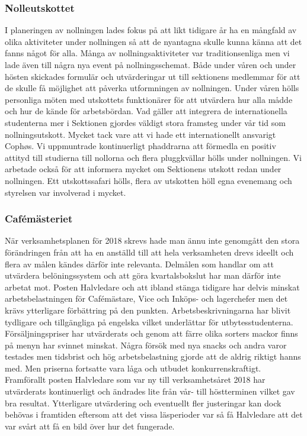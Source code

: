 \documentclass[../_main/handlingar.tex]{subfiles}
\begin{document}
\subsubsection*{Nolleutskottet}

I planeringen av nollningen lades fokus på att likt tidigare år ha en mångfald av olika aktiviteter under
nollningen så att de nyantagna skulle kunna känna att det fanns något för alla. Många av
nollningsaktiviteter var traditionsenliga men vi lade även till några nya event på nollningsschemat.
Både under våren och under hösten skickades formulär och utvärderingar ut till sektionens
medlemmar för att de skulle få möjlighet att påverka utformningen av nollningen. Under våren hölls
personliga möten med utskottets funktionärer för att utvärdera hur alla mådde och hur de kände för
arbetsbördan.
Vad gäller att integrera de internationella studenterna mer i Sektionen gjordes väldigt stora framsteg
under vår tid som nollningsutskott. Mycket tack vare att vi hade ett internationellt ansvarigt Cophøs.
Vi uppmuntrade kontinuerligt phaddrarna att förmedla en positiv attityd till studierna till nollorna
och flera pluggkvällar hölls under nollningen. Vi arbetade också för att informera mycket om
Sektionens utskott redan under nollningen. Ett utskottssafari hölls, flera av utskotten höll egna
evenemang och styrelsen var involverad i mycket.



\subsubsection*{Cafémästeriet}

När verksamhetsplanen för 2018 skrevs hade man ännu inte genomgått den stora förändringen från
att ha en anställd till att hela verksamheten drevs ideellt och flera av målen kändes därför inte
relevanta. Delmålen som handlar om att utvärdera belöningssystem och att göra kvartalsbokslut har
man därför inte arbetat mot. Posten Halvledare och att ibland stänga tidigare har delvis minskat
arbetsbelastningen för Cafémästare, Vice och Inköps- och lagerchefer men det krävs ytterligare
förbättring på den punkten. Arbetsbeskrivningarna har blivit tydligare och tillgängliga på engelska
vilket underlättar för utbytesstudenterna.
Försäljningspriser har utvärderats och genom att färre olika sorters mackor finns på menyn har
svinnet minskat. Några försök med nya snacks och andra varor testades men tidsbrist och hög
arbetsbelastning gjorde att de aldrig riktigt hanns med. Men priserna fortsatte vara låga och utbudet
konkurrenskraftigt.
Framförallt posten Halvledare som var ny till verksamhetsåret 2018 har utvärderats kontinuerligt och
ändrades lite från vår- till höstterminen vilket gav bra resultat. Ytterligare utvärdering och eventuellt
fler justeringar kan dock behövas i framtiden eftersom att det vissa läsperioder var så få Halvledare
att det var svårt att få en bild över hur det fungerade.
\end{document}
